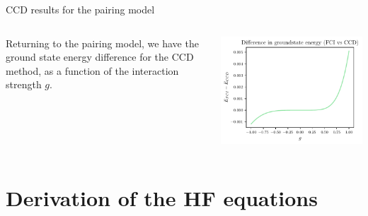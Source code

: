\documentclass[UKenglish,aspectratio=169]{beamer}
\begin{document}
\begin{frame}{CCD results for the pairing model}
    \begin{columns}
        \begin{column}{.49\textwidth}
            Returning to the pairing model, we have the ground state energy difference for the CCD method, as a function of the interaction strength $g$.
        \end{column}

        \begin{column}{.49\textwidth}
            \includegraphics[width=\textwidth]{../midterm2/figures/ccd_groundstate_energy_diff.pdf}
        \end{column}
    \end{columns}
\end{frame}


\appendix
\section{Derivation of the HF equations}
\end{document}
